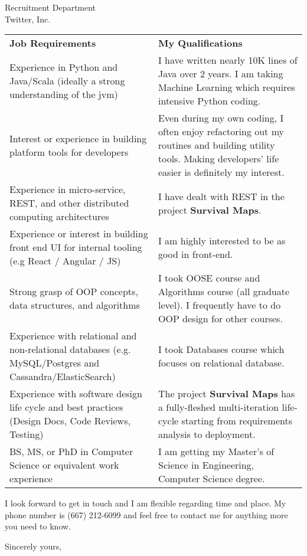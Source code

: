 \documentclass[11pt]{letter} %
\begin{document}
\begin{letter}{Recruitment Department \\
Twitter, Inc.}
\begin{tabular}{p{0.5\linewidth} p{0.5\linewidth}}
\textbf{Job Requirements} & \textbf{My Qualifications} \\
Experience in Python and Java/Scala (ideally a strong understanding of the jvm) & I have written nearly 10K lines of Java over 2 years. I am taking Machine Learning which requires intensive Python coding. \\
Interest or experience in building platform tools for developers & Even during my own coding, I often enjoy refactoring out my routines and building utility tools. Making developers' life easier is definitely my interest.\\
Experience in micro-service, REST, and other distributed computing architectures & I have dealt with REST in the project \textbf{Survival Maps}. \\
Experience or interest in building front end UI for internal tooling (e.g React / Angular / JS) & I am highly interested to be as good in front-end.\\
Strong grasp of OOP concepts, data structures, and algorithms & I took OOSE course and Algorithms course (all graduate level). I frequently have to do OOP design for other courses.\\
Experience with relational and non-relational databases (e.g. MySQL/Postgres and Cassandra/ElasticSearch) & I took Databases course which focuses on relational database. \\
Experience with software design life cycle and best practices (Design Docs, Code Reviews, Testing) & The project \textbf{Survival Maps} has a fully-fleshed multi-iteration life-cycle starting from requirements analysis to deployment. \\
BS, MS, or PhD in Computer Science or equivalent work experience & I am getting my Master's of Science in Engineering, Computer Science degree.
\end{tabular}

I look forward to get in touch and I am flexible regarding time and place. My phone number is (667) 212-6099 and feel free to contact me for anything more you need to know.

\closing{Sincerely yours,}




\end{letter}
\end{document}
